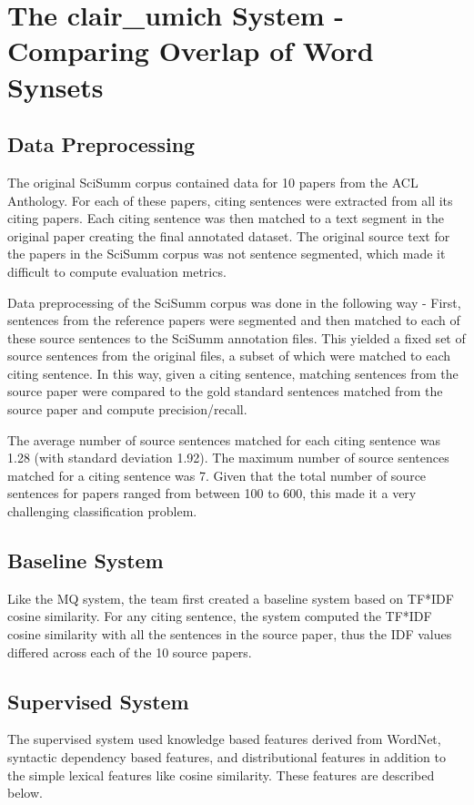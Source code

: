 \documentclass[11pt]{article}
\begin{document}
\section{The clair\_umich System - Comparing Overlap of Word Synsets}
\subsection{Data Preprocessing}

The original SciSumm corpus contained data for 10 papers from the ACL Anthology. For each of these papers, citing sentences were extracted from all its citing papers. Each citing sentence was then matched to a text segment in the original paper creating the final annotated dataset. The original source text for the papers in the SciSumm corpus was not sentence segmented, which made it difficult to compute evaluation metrics.

Data preprocessing of the SciSumm corpus was done in the following way - First, sentences from the reference papers were segmented and then matched to each of these source sentences to the SciSumm annotation files. This yielded a fixed set of source sentences from the original files, a subset of which were matched to each citing sentence. In this way, given a citing sentence, matching sentences from the source paper were compared to the gold standard sentences matched from the source paper and compute precision/recall. 

The average number of source sentences matched for each citing sentence was 1.28 (with standard deviation 1.92). The maximum number of source sentences matched for a citing sentence was 7. Given that the total number of source sentences for papers ranged from between 100 to 600, this made it a very challenging classification problem. 


\subsection{Baseline System}

Like the MQ system, the team first created a baseline system based on TF*IDF cosine similarity. For any citing sentence, the system computed the TF*IDF cosine similarity with all the sentences in the source paper, thus the IDF values differed across each of the 10 source papers. 

\subsection{Supervised System}
The supervised system used knowledge based features derived from WordNet, syntactic dependency based features, and distributional features in addition to the simple lexical features like cosine similarity. These features are described below.
\end{document}
